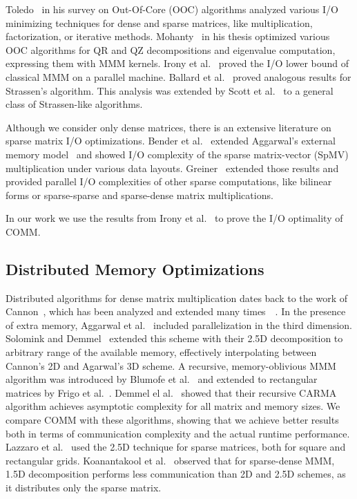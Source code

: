 \documentclass[sigplan,review,anonymous,10pt]{acmart}\settopmatter{printfolios=true,printccs=false,printacmref=false}
\begin{document}
Toledo~\cite{IOsurvey} in his survey on Out-Of-Core (OOC) algorithms analyzed 
various I/O minimizing techniques for dense and sparse matrices, like 
multiplication, factorization, or iterative methods. 
Mohanty~\cite{MohantyThesis} in his thesis optimized various OOC algorithms for 
QR and QZ decompositions and eigenvalue computation, expressing them with MMM 
kernels. Irony et 
al.~\cite{IronyMMM} proved the I/O lower bound of classical MMM on a parallel 
machine. Ballard et al.~\cite{strassenBounds} proved analogous results for 
Strassen's algorithm. This analysis was extended by Scott et 
al.~\cite{generalStrassenBounds} to a general class of Strassen-like algorithms.

Although we consider only dense matrices, there is an extensive literature on 
sparse matrix I/O optimizations. Bender et al.~\cite{SpMVIO} extended 
Aggarwal's external memory model~\cite{externalMem} and showed I/O complexity 
of the sparse matrix-vector (SpMV) multiplication under various data layouts. 
Greiner~\cite{SpEverything} extended those results and provided parallel I/O 
complexities of other sparse computations, like bilinear forms or sparse-sparse 
and sparse-dense matrix multiplications. 

In our work we use the results from Irony et 
al.~\cite{IronyMMM} to prove the I/O optimality of COMM.


\subsection{Distributed Memory Optimizations}
Distributed algorithms for dense matrix multiplication dates back to the work 
of 
Cannon~\cite{Cannon}, which has been analyzed and extended many 
times~\cite{MManalysis}~\cite{generalCannon}. In the presence of extra memory, 
Aggarwal et al.~\cite{summa3d} included parallelization in the third dimension. 
Solomink and Demmel~\cite{25d} extended this scheme with their 2.5D 
decomposition to arbitrary range of 
the available memory, effectively interpolating between Cannon's 2D and 
Agarwal's 
3D scheme. A recursive, memory-oblivious 
MMM algorithm was introduced by 
Blumofe 
et al.~\cite{recursiveMM} and extended to rectangular matrices by Frigo et 
al.~\cite{recursiveRectangularMM}. Demmel el al.~\cite{CARMA} showed that their 
recursive CARMA algorithm achieves asymptotic complexity for all matrix and 
memory sizes. We compare COMM with these algorithms, showing that we achieve 
better results both in terms of communication complexity and the actual runtime
performance. 
Lazzaro et al.~\cite{lazzaroSpMM} used the 2.5D technique for sparse 
matrices, both for square and rectangular grids. Koanantakool et 
al.~\cite{sparse15D} observed that for sparse-dense MMM, 1.5D decomposition 
performs less communication than 2D and 2.5D schemes, as it distributes only 
the sparse matrix.
\end{document}
